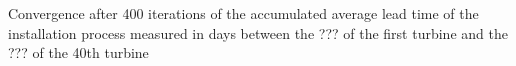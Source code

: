\label{fig:convergence}
Convergence after 400 iterations of the accumulated average lead time of the installation process measured in days between the ??? of the first turbine and the ??? of the 40th turbine 